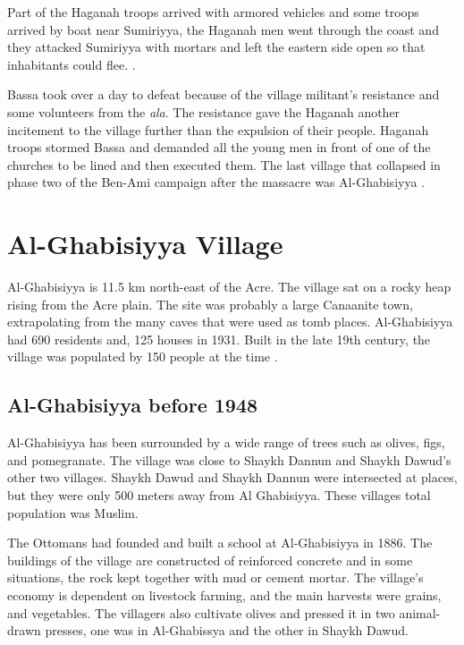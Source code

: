 Part of the Haganah troops arrived with armored vehicles and some troops arrived by boat near Sumiriyya, the Haganah men went through the coast and they attacked Sumiriyya with mortars and left the eastern side open so that inhabitants could flee. \citep{Morris2004, Morris2008}.

Bassa took over a day to defeat because of the village militant's resistance and some volunteers from the \textit{\acrfull{ala}}. The resistance gave the Haganah another incitement to  the village further than the expulsion of their people. Haganah troops stormed Bassa and demanded all the young men in front of one of the churches to be lined and then executed them. The last village that collapsed in phase two of the Ben-Ami campaign after the massacre was Al-Ghabisiyya \citep{Morris2004, Pappe2006}.  



\section{Al-Ghabisiyya Village}

Al-Ghabisiyya is 11.5 km north-east of the Acre. The village sat on a rocky heap rising from the Acre plain. The site was probably a large Canaanite town, extrapolating from the many caves that were used as tomb places.
Al-Ghabisiyya had 690 residents and, 125 houses in 1931. Built in the late 19th century, the village was populated by 150 people at the time \citep{Khalidi2015}.
\subsection{Al-Ghabisiyya before 1948}

 Al-Ghabisiyya has been surrounded by a wide range of trees such as olives, figs, and pomegranate. The village was close to Shaykh Dannun and Shaykh Dawud's other two villages. Shaykh Dawud and Shaykh Dannun were intersected at places, but they were only 500 meters away from Al Ghabisiyya. These villages total population was Muslim. 

The Ottomans had founded and built a school at Al-Ghabisiyya in 1886. The buildings of the village are constructed of reinforced concrete and in some situations, the rock kept together with mud or cement mortar. The village's economy is dependent on livestock farming, and the main harvests were grains, and vegetables. The villagers also cultivate olives and pressed it in two animal-drawn presses, one was in Al-Ghabissya and the other in Shaykh Dawud.

